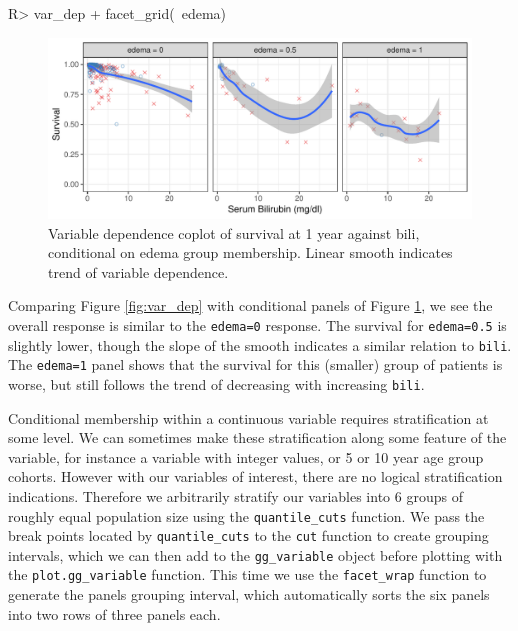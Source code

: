 \documentclass[article, nojss]{jss}
\begin{document}
\begin{Schunk}
\begin{Sinput}
R> var_dep + facet_grid(~edema)
\end{Sinput}
\begin{figure}[!htb]

{\centering \includegraphics{rfs-coplot_bilirubin-1}

}

\caption[Variable dependence coplot of survival at 1 year against bili, conditional on edema group membership]{Variable dependence coplot of survival at 1 year against bili, conditional on edema group membership. Linear smooth indicates trend of variable dependence.}\label{fig:coplot_bilirubin}
\end{figure}
\end{Schunk}

Comparing Figure \ref{fig:var_dep} with conditional panels of Figure
\ref{fig:coplot_bilirubin}, we see the overall response is similar to
the \texttt{edema=0} response. The survival for \texttt{edema=0.5} is
slightly lower, though the slope of the smooth indicates a similar
relation to \texttt{bili}. The \texttt{edema=1} panel shows that the
survival for this (smaller) group of patients is worse, but still
follows the trend of decreasing with increasing \texttt{bili}.

Conditional membership within a continuous variable requires
stratification at some level. We can sometimes make these stratification
along some feature of the variable, for instance a variable with integer
values, or 5 or 10 year age group cohorts. However with our variables of
interest, there are no logical stratification indications. Therefore we
arbitrarily stratify our variables into 6 groups of roughly equal
population size using the \texttt{quantile\_cuts} function. We pass the
break points located by \texttt{quantile\_cuts} to the \texttt{cut}
function to create grouping intervals, which we can then add to the
\texttt{gg\_variable} object before plotting with the
\texttt{plot.gg\_variable} function. This time we use the
\texttt{facet\_wrap} function to generate the panels grouping interval,
which automatically sorts the six panels into two rows of three panels
each.
\end{document}

